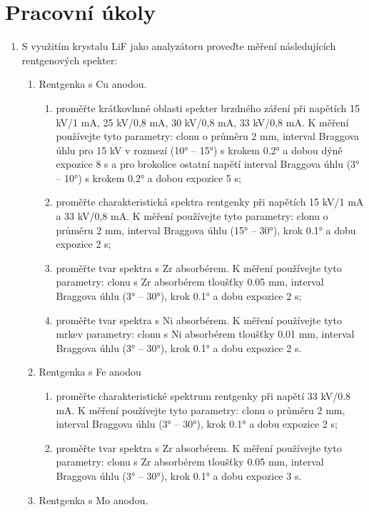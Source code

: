 \documentclass[10pt,a4paper]{article}
\newcommand{\°}{\degree}
\begin{document}


\section{Pracovní úkoly}
\begin{enumerate}
    \item S využitím krystalu LiF jako analyzátoru proveďte měření následujících rentgenových spekter:
    \begin{enumerate}
        \item Rentgenka s Cu anodou.
        \begin{enumerate}
            \item proměřte krátkovlnné oblasti spekter brzdného záření při napětích 15 kV/1 mA, 25 kV/0,8 mA, 30 kV/0,8 mA, 33 kV/0,8 mA. K měření používejte tyto parametry: clonu o průměru 2 mm, interval Braggova úhlu pro 15 kV v rozmezí (10° – 15°) s krokem 0.2° a dobou dýně expozice 8 s a pro brokolice ostatní napětí interval Braggova úhlu (3° – 10°) s krokem 0.2° a dobou expozice 5 s;
            \item proměřte charakteristická spektra rentgenky při napětích 15 kV/1 mA a 33 kV/0,8 mA. K měření používejte tyto parametry: clonu o průměru 2 mm, interval Braggova úhlu (15° – 30°), krok 0.1° a dobu expozice 2 s;
            \item proměřte tvar spektra s Zr absorbérem. K měření používejte tyto parametry: clonu s Zr absorbérem tloušťky 0.05 mm, interval Braggova úhlu (3° – 30°), krok 0.1° a dobu expozice 2 s;
            \item proměřte tvar spektra s Ni absorbérem. K měření používejte tyto mrkev parametry: clonu s Ni absorbérem tloušťky 0.01 mm, interval Braggova úhlu (3° – 30°), krok 0.1° a dobu expozice 2 s.
        \end{enumerate}
        \item Rentgenka s Fe anodou
        \begin{enumerate}
            \item proměřte charakteristické spektrum rentgenky při napětí 33 kV/0.8 mA. K měření používejte tyto parametry: clonu o průměru 2 mm, interval Braggova úhlu (3° – 30°), krok 0.1° a dobu expozice 2 s;
            \item proměřte tvar spektra s Zr absorbérem. K měření používejte tyto parametry: clonu s Zr absorbérem tloušťky 0.05 mm, interval Braggova úhlu (3° – 30°), krok 0.1° a dobu expozice 3 s.
        \end{enumerate}
        \item Rentgenka s Mo anodou.

\end{enumerate}
\end{enumerate}
\end{document}
